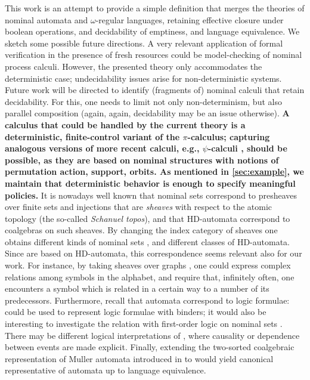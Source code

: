 This work is an attempt to provide a simple definition that merges the theories of nominal automata and $\omega$-regular languages, retaining effective closure under boolean operations, and decidability of emptiness, and language equivalence. We sketch some possible future directions. A very relevant application of formal verification in the presence of fresh resources could be model-checking of nominal process calculi. However, the presented theory only accommodates the deterministic case; undecidability issues arise for non-deterministic systems. Future work will be directed to identify (fragments of) nominal calculi that retain decidability. For this, one needs to limit not only non-determinism, but also parallel composition (again, again, decidability may be an issue otherwise). {\bf A calculus that could be handled by the current theory is a deterministic, finite-control variant of the $\pi$-calculus; capturing analogous versions of more recent calculi, e.g., $\psi$-calculi \cite{Bengtson11}, should be possible, as they are based on nominal structures with notions of permutation action, support, orbits. As mentioned in \autoref{sec:example}, we maintain that deterministic behavior is enough to specify meaningful policies.} It is nowadays well known that nominal sets correspond to presheaves over finite sets and injections that are \emph{sheaves} with respect to the atomic topology (the so-called \emph{Schanuel topos}), and that HD-automata correspond to coalgebras on such sheaves. By changing the index category of sheaves one obtains different kinds of nominal sets \cite{CianciaKM10}, and different classes of HD-automata. Since \hdmas{} are based on HD-automata, this correspondence seems relevant also for our work. For instance, by taking sheaves over graphs \cite{SammartinoPhD}, one could express complex relations among symbols in the alphabet, and require that, infinitely often, one encounters a symbol which is related in a certain way to a number of its predecessors. Furthermore, recall that automata correspond to logic formulae: \hdmas{} could be used to represent logic formulae with binders; it would also be interesting to investigate the relation with first-order logic on nominal sets \cite{Bojanczyk13}. There may be different logical interpretations of \hdmas, where causality or dependence \cite{Vnnen07,Galliani12} between events are made explicit. Finally, extending the two-sorted coalgebraic representation of Muller automata introduced in \cite{CV12} to \hdmas{} would yield canonical representative of automata up to language equivalence.




